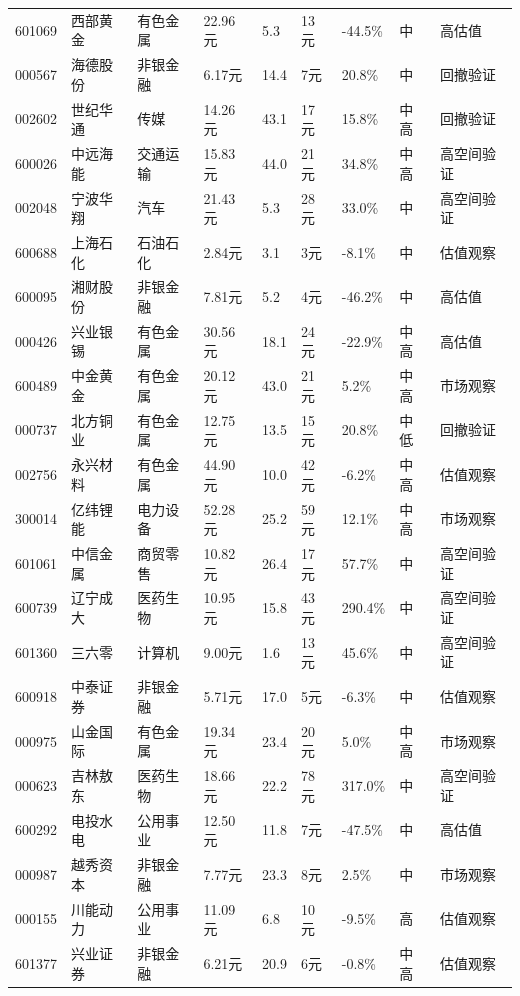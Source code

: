 \begin{longtable}{L{1.05cm}L{1.55cm}L{1.55cm}R{0.85cm}R{0.85cm}R{0.85cm}R{0.85cm}R{0.65cm}L{2.65cm}}
601069 & 西部黄金 & 有色金属 & 22.96元 & 5.3 & 13元 & -44.5\% & 中 & 高估值 \\
000567 & 海德股份 & 非银金融 & 6.17元 & 14.4 & 7元 & 20.8\% & 中 & 回撤验证 \\
002602 & 世纪华通 & 传媒 & 14.26元 & 43.1 & 17元 & 15.8\% & 中高 & 回撤验证 \\
600026 & 中远海能 & 交通运输 & 15.83元 & 44.0 & 21元 & 34.8\% & 中高 & 高空间验证 \\
002048 & 宁波华翔 & 汽车 & 21.43元 & 5.3 & 28元 & 33.0\% & 中 & 高空间验证 \\
600688 & 上海石化 & 石油石化 & 2.84元 & 3.1 & 3元 & -8.1\% & 中 & 估值观察 \\
600095 & 湘财股份 & 非银金融 & 7.81元 & 5.2 & 4元 & -46.2\% & 中 & 高估值 \\
000426 & 兴业银锡 & 有色金属 & 30.56元 & 18.1 & 24元 & -22.9\% & 中高 & 高估值 \\
600489 & 中金黄金 & 有色金属 & 20.12元 & 43.0 & 21元 & 5.2\% & 中高 & 市场观察 \\
000737 & 北方铜业 & 有色金属 & 12.75元 & 13.5 & 15元 & 20.8\% & 中低 & 回撤验证 \\
002756 & 永兴材料 & 有色金属 & 44.90元 & 10.0 & 42元 & -6.2\% & 中高 & 估值观察 \\
300014 & 亿纬锂能 & 电力设备 & 52.28元 & 25.2 & 59元 & 12.1\% & 中高 & 市场观察 \\
601061 & 中信金属 & 商贸零售 & 10.82元 & 26.4 & 17元 & 57.7\% & 中 & 高空间验证 \\
600739 & 辽宁成大 & 医药生物 & 10.95元 & 15.8 & 43元 & 290.4\% & 中 & 高空间验证 \\
601360 & 三六零 & 计算机 & 9.00元 & 1.6 & 13元 & 45.6\% & 中 & 高空间验证 \\
600918 & 中泰证券 & 非银金融 & 5.71元 & 17.0 & 5元 & -6.3\% & 中 & 估值观察 \\
000975 & 山金国际 & 有色金属 & 19.34元 & 23.4 & 20元 & 5.0\% & 中高 & 市场观察 \\
000623 & 吉林敖东 & 医药生物 & 18.66元 & 22.2 & 78元 & 317.0\% & 中 & 高空间验证 \\
600292 & 电投水电 & 公用事业 & 12.50元 & 11.8 & 7元 & -47.5\% & 中 & 高估值 \\
000987 & 越秀资本 & 非银金融 & 7.77元 & 23.3 & 8元 & 2.5\% & 中 & 市场观察 \\
000155 & 川能动力 & 公用事业 & 11.09元 & 6.8 & 10元 & -9.5\% & 高 & 估值观察 \\
601377 & 兴业证券 & 非银金融 & 6.21元 & 20.9 & 6元 & -0.8\% & 中高 & 估值观察 \\

\end{longtable}

